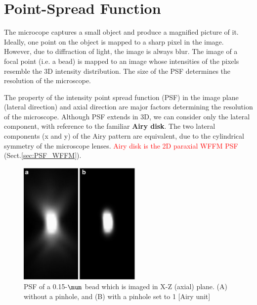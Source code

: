 \section{Point-Spread Function}
\label{sec:PSF}


The microcope captures a small object and produce a magnified picture of it.
Ideally, one point on the object is mapped to a sharp pixel in the image.
However, due to diffraction of light, the image is always blur. The image of a
focal point (i.e. a bead) is mapped to an image whose intensities of the pixels
resemble the 3D intensity distribution. The size of the PSF determines the
resolution of the microscope. 

The property of the intensity point spread function (PSF) in the image plane
(lateral direction) and axial direction are major factors determining the
resolution of the microscope. Although PSF extends in 3D, we can consider only
the lateral component, with reference to the familiar {\bf Airy disk}. The two
lateral components (x and y) of the Airy pattern are equivalent, due to the
cylindrical symmetry of the microscope lenses. \textcolor{red}{Airy disk is the
2D paraxial WFFM PSF} (Sect.\ref{sec:PSF_WFFM}).

\begin{figure}[hbt]
  \centerline{\includegraphics[height=6cm,
    angle=0]{./images/PSF_axial.eps}}
  \caption{PSF of a 0.15-$\mum$ bead which is imaged in X-Z (axial) plane. (A)
  without a pinhole, and (B) with a pinhole set to 1 [Airy unit]}
\label{fig:PSF_axial}
\end{figure}

